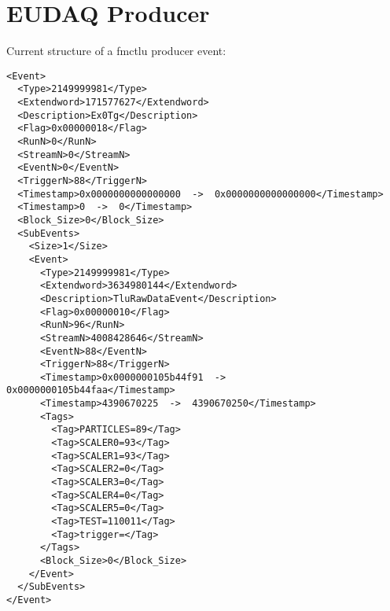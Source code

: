 \section{EUDAQ Producer}\label{ch:eudaqprod}
Current structure of a fmctlu producer event:
\lstset{language=XML}
\scriptsize
\begin{lstlisting}
<Event>
  <Type>2149999981</Type>
  <Extendword>171577627</Extendword>
  <Description>Ex0Tg</Description>
  <Flag>0x00000018</Flag>
  <RunN>0</RunN>
  <StreamN>0</StreamN>
  <EventN>0</EventN>
  <TriggerN>88</TriggerN>
  <Timestamp>0x0000000000000000  ->  0x0000000000000000</Timestamp>
  <Timestamp>0  ->  0</Timestamp>
  <Block_Size>0</Block_Size>
  <SubEvents>
    <Size>1</Size>
    <Event>
      <Type>2149999981</Type>
      <Extendword>3634980144</Extendword>
      <Description>TluRawDataEvent</Description>
      <Flag>0x00000010</Flag>
      <RunN>96</RunN>
      <StreamN>4008428646</StreamN>
      <EventN>88</EventN>
      <TriggerN>88</TriggerN>
      <Timestamp>0x0000000105b44f91  ->  0x0000000105b44faa</Timestamp>
      <Timestamp>4390670225  ->  4390670250</Timestamp>
      <Tags>
        <Tag>PARTICLES=89</Tag>
        <Tag>SCALER0=93</Tag>
        <Tag>SCALER1=93</Tag>
        <Tag>SCALER2=0</Tag>
        <Tag>SCALER3=0</Tag>
        <Tag>SCALER4=0</Tag>
        <Tag>SCALER5=0</Tag>
        <Tag>TEST=110011</Tag>
        <Tag>trigger=</Tag>
      </Tags>
      <Block_Size>0</Block_Size>
    </Event>
  </SubEvents>
</Event>
\end{lstlisting}
\normalsize
